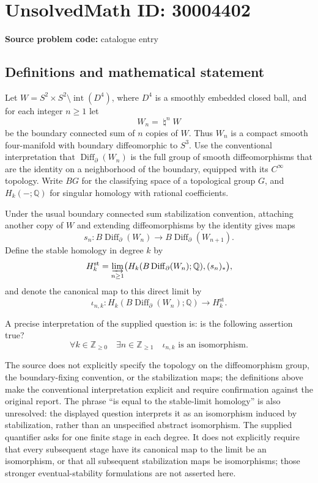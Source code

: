 \documentclass[11pt]{article}
\newcommand{\Z}{\mathbb{Z}}
\newcommand{\Q}{\mathbb{Q}}
\begin{document}
\section*{UnsolvedMath ID: 30004402}
\textbf{Source problem code:} catalogue entry
\subsection{Definitions and mathematical statement}
Let \(W=S^2\times S^2\setminus\operatorname{int}(D^4)\), where \(D^4\) is a smoothly embedded closed ball, and for each integer \(n\geq 1\) let
\[
W_n=\mathop{\natural}^{n}W
\]
be the boundary connected sum of \(n\) copies of \(W\). Thus \(W_n\) is a compact smooth four-manifold with boundary diffeomorphic to \(S^3\). Use the conventional interpretation that \(\operatorname{Diff}_{\partial}(W_n)\) is the full group of smooth diffeomorphisms that are the identity on a neighborhood of the boundary, equipped with its \(C^\infty\) topology. Write \(BG\) for the classifying space of a topological group \(G\), and \(H_k(-;\Q)\) for singular homology with rational coefficients.

Under the usual boundary connected sum stabilization convention, attaching another copy of \(W\) and extending diffeomorphisms by the identity gives maps
\[
s_n:B\operatorname{Diff}_{\partial}(W_n)\longrightarrow B\operatorname{Diff}_{\partial}(W_{n+1}).
\]
Define the stable homology in degree \(k\) by
\[
H_k^{\mathrm{st}}=\varinjlim_{n\geq 1}\bigl(H_k(B\operatorname{Diff}_{\partial}(W_n);\Q),(s_n)_*\bigr),
\]
and denote the canonical map to this direct limit by
\[
\iota_{n,k}:H_k(B\operatorname{Diff}_{\partial}(W_n);\Q)\longrightarrow H_k^{\mathrm{st}}.
\]

A precise interpretation of the supplied question is: is the following assertion true?
\[
\forall k\in\Z_{\geq 0}\quad\exists n\in\Z_{\geq 1}\quad
\iota_{n,k}\text{ is an isomorphism}.
\]

The source does not explicitly specify the topology on the diffeomorphism group, the boundary-fixing convention, or the stabilization maps; the definitions above make the conventional interpretation explicit and require confirmation against the original report. The phrase ``is equal to the stable-limit homology'' is also unresolved: the displayed question interprets it as an isomorphism induced by stabilization, rather than an unspecified abstract isomorphism. The supplied quantifier asks for one finite stage in each degree. It does not explicitly require that every subsequent stage have its canonical map to the limit be an isomorphism, or that all subsequent stabilization maps be isomorphisms; those stronger eventual-stability formulations are not asserted here.
\end{document}
